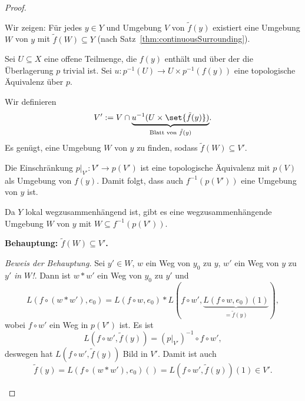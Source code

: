 \documentclass[language=ngerman]{TemplateLecture} %
\begin{document}
\begin{proof}
\begin{description}
        Wir zeigen: Für jedes $y \in Y$ und Umgebung $V$ von $\tilde{f}(y)$ existiert eine Umgebung $W$ von $y$ mit $\tilde{f}(W) \subseteq Y$ (nach Satz~\ref{thm:continuousSurrounding}).

        Sei $U \subseteq X$ eine offene Teilmenge, die $f(y)$ enthält und über der die Überlagerung $p$ trivial ist. Sei $u: p^{-1}(U) \to U \times p^{-1}(f(y))$ eine topologische Äquivalenz über $p$.

        Wir definieren
        \begin{equation*}
            V' := V \cap\underset{\text{Blatt von $\tilde{f}(y)$}}{\underbrace{u^{-1}(U \times \set{\tilde{f}(y)})}}.
        \end{equation*} 
        Es genügt, eine Umgebung $W$ von $y$ zu finden, sodass $\tilde{f}(W) \subseteq V'$.

        Die Einschränkung $p|_{V'}: V' \to p(V')$ ist eine topologische Äquivalenz mit $p(V)$ als Umgebung von $f(y)$. Damit folgt, dass auch $f^{-1}(p(V'))$ eine Umgebung von $y$ ist.

        Da $Y$ lokal wegzusammenhängend ist, gibt es eine wegzusammenhängende Umgebung $W$ von $y$ mit $W \subseteq f^{-1}(p(V'))$.

        \textbf{Behauptung: $\tilde{f}(W) \subseteq V'$.}

        \emph{Beweis der Behauptung.} Sei $y' \in W$, $w$ ein Weg von $y_0$ zu $y$, $w'$ ein Weg von $y$ zu $y'$ \emph{in $W$!}. Dann ist $w * w'$ ein Weg von $y_0$ zu $y'$ und 
        \begin{equation*}
            L(f \circ (w * w'), e_0) = L(f \circ w, e_0) * L(f \circ w', \underset{=\tilde{f}(y)}{\underbrace{L(f \circ w, e_0)(1)}}),
        \end{equation*}
        wobei $f \circ w'$ ein Weg in $p(V')$ ist. Es ist
        \begin{equation*}
            L(f \circ w', \tilde{f}(y))  = \left(p|_{V'}\right)^{-1} \circ f \circ w',
        \end{equation*}
        deswegen hat $L(f \circ w', \tilde{f}(y))$ Bild in $V'$. Damit ist auch 
        \begin{equation*}
            \tilde{f}(y) = L(f \circ (w * w'), e_0)() = L(f \circ w', \tilde{f}(y))(1) \in V'.
        \end{equation*}
    \end{description}
\end{proof}
\end{document}
